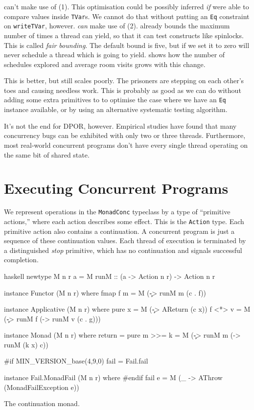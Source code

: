 \dejafu{} can't make use of (1).  This optimisation could be possibly
inferred \emph{if} \dejafu{} were able to compare values inside
\verb|TVar|s.  We cannot do that without putting an \verb|Eq|
constraint on \verb|writeTVar|, however.  \dejafu{} \emph{can} make
use of (2).  \dejafu{} already bounds the maximum number of times a
thread can yield, so that it can test constructs like spinlocks.  This
is called \emph{fair bounding}.  The default bound is five, but if we
set it to zero \dejafu{} will never schedule a thread which is going
to yield.   shows how the number of schedules
explored and average room visits grows with this change.

This is better, but still scales poorly.  The prisoners are stepping
on each other's toes and causing needless work.  This is probably as
good as we can do without adding some extra primitives to \dejafu{} to
optimise the case where we have an \verb|Eq| instance available, or by
using an alternative systematic testing algorithm.

It's not the end for DPOR, however.  Empirical
studies\cite{thomson2014} have found that many concurrency bugs can be
exhibited with only two or three threads.  Furthermore, most
real-world concurrent programs don't have every single thread
operating on the same bit of shared state.

\section{Executing Concurrent Programs}
\label{sec:dejafu-execution}

We represent operations in the \verb|MonadConc| typeclass by a type of
``primitive actions,'' where each action describes some effect.  This
is the \verb|Action| type.  Each primitive action also contains a
continuation.  A concurrent program is just a sequence of these
continuation values.  Each thread of execution is terminated by a
distinguished \emph{stop} primitive, which has no continuation and
signals successful completion.

\begin{listing}
\centering
\begin{cminted}{haskell}
newtype M n r a = M { runM :: (a -> Action n r) -> Action n r }

instance Functor (M n r) where
  fmap f m = M (\c -> runM m (c . f))

instance Applicative (M n r) where
  pure x  = M (\c -> AReturn (c x))
  f <*> v = M (\c -> runM f (\g -> runM v (c . g)))

instance Monad (M n r) where
  return  = pure
  m >>= k = M (\c -> runM m (\x -> runM (k x) c))

#if MIN_VERSION_base(4,9,0)
  fail = Fail.fail

instance Fail.MonadFail (M n r) where
#endif
  fail e = M (\_ -> AThrow (MonadFailException e))
\end{cminted}
\caption{The \dejafu{} continuation monad.}\label{lst:m}
\end{listing}

